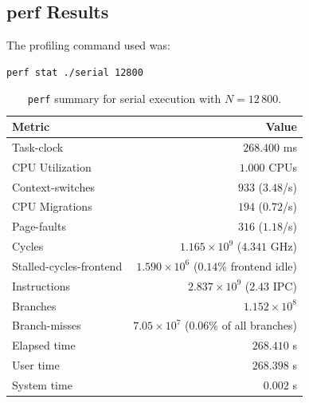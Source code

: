\documentclass{article}
\begin{document}
\subsection{perf Results}
\label{appendix:perf_results}
The profiling command used was:
\begin{verbatim}
perf stat ./serial 12800
\end{verbatim}
\begin{table}[H]
\centering
\label{tab:perf_summary}
\begin{tabular}{l r}
\toprule
\textbf{Metric} & \textbf{Value} \\
\midrule
Task-clock & $268.400$ ms \\
CPU Utilization & $1.000$ CPUs \\
Context-switches & $933$ ($3.48$/s) \\
CPU Migrations & $194$ ($0.72$/s) \\
Page-faults & $316$ ($1.18$/s) \\
Cycles & $1.165 \times 10^{9}$ ($4.341$ GHz) \\
Stalled-cycles-frontend & $1.590 \times 10^{6}$ ($0.14\%$ frontend idle) \\
Instructions & $2.837 \times 10^{9}$ ($2.43$ IPC) \\
Branches & $1.152 \times 10^{8}$ \\
Branch-misses & $7.05 \times 10^{7}$ ($0.06\%$ of all branches) \\
Elapsed time & $268.410$ s \\
User time & $268.398$ s \\
System time & $0.002$ s \\
\bottomrule
\end{tabular}
\caption{\texttt{perf} summary for serial execution with $N = 12\,800$.}
\end{table}





 
\end{document}
